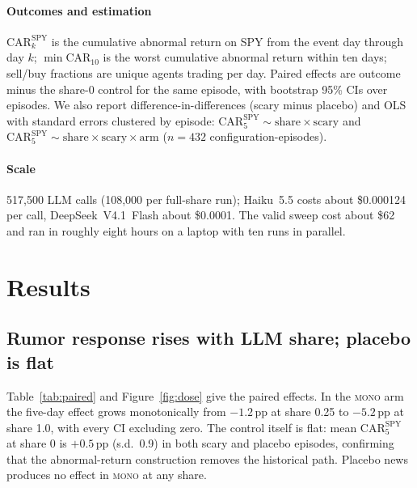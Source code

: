 \documentclass[10pt]{article}
\begin{document}
\paragraph{Outcomes and estimation} $\mathrm{CAR}^{\mathrm{SPY}}_{k}$ is the cumulative abnormal return on SPY from the event day through day $k$; $\min\mathrm{CAR}_{10}$ is the worst cumulative abnormal return within ten days; sell/buy fractions are unique agents trading per day. Paired effects are outcome minus the share-0 control for the same episode, with bootstrap 95\% CIs over episodes. We also report difference-in-differences (scary minus placebo) and OLS with standard errors clustered by episode: $\mathrm{CAR}^{\mathrm{SPY}}_5 \sim \mathrm{share}\times\mathrm{scary}$ and $\mathrm{CAR}^{\mathrm{SPY}}_5 \sim \mathrm{share}\times\mathrm{scary}\times\mathrm{arm}$ ($n=432$ configuration-episodes).

\paragraph{Scale} 517{,}500 LLM calls (108{,}000 per full-share run); Haiku~5.5 costs about \$0.000124 per call, DeepSeek~V4.1~Flash about \$0.0001. The valid sweep cost about \$62 and ran in roughly eight hours on a laptop with ten runs in parallel.

\section{Results}


\subsection{Rumor response rises with LLM share; placebo is flat}

Table~\ref{tab:paired} and Figure~\ref{fig:dose} give the paired effects. In the \textsc{mono} arm the five-day effect grows monotonically from $-1.2$\,pp at share 0.25 to $-5.2$\,pp at share 1.0, with every CI excluding zero. The control itself is flat: mean $\mathrm{CAR}^{\mathrm{SPY}}_5$ at share 0 is $+0.5$\,pp (s.d.\ 0.9) in both scary and placebo episodes, confirming that the abnormal-return construction removes the historical path. Placebo news produces no effect in \textsc{mono} at any share.
\end{document}
